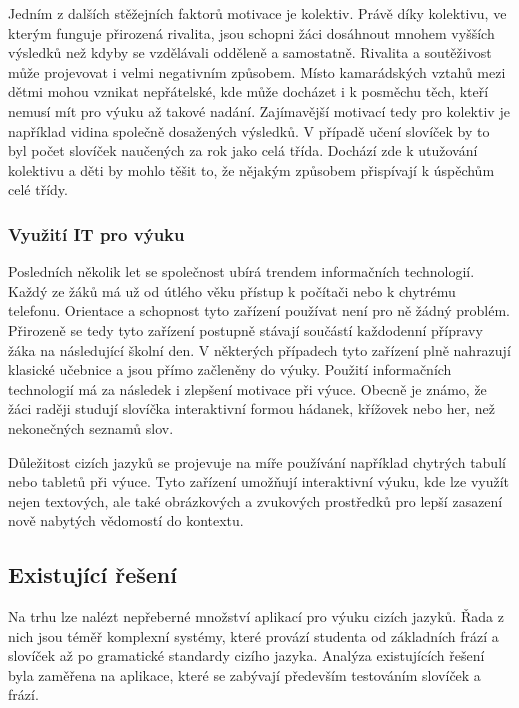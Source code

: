 \documentclass[a4paper,11pt,titlepage,fleqn]{article}
\begin{document}

            Jedním z dalších stěžejních faktorů motivace je kolektiv. Právě díky kolektivu, ve kterým funguje přirozená rivalita, jsou schopni žáci dosáhnout mnohem vyšších výsledků než kdyby se vzdělávali odděleně a samostatně. Rivalita a soutěživost může projevovat i velmi negativním způsobem. Místo kamarádských vztahů mezi dětmi mohou vznikat nepřátelské, kde může docházet i k posměchu těch, kteří nemusí mít pro výuku až takové nadání. Zajímavější motivací tedy pro kolektiv je například vidina společně dosažených výsledků. V případě učení slovíček by to byl počet slovíček naučených za rok jako celá třída. Dochází zde k utužování kolektivu a děti by mohlo těšit to, že nějakým způsobem přispívají k úspěchům celé třídy.

        \subsubsection{Využití IT pro výuku}
            Posledních několik let se společnost ubírá trendem informačních technologií. Každý ze žáků má už od útlého věku přístup k počítači nebo k chytrému telefonu. Orientace a schopnost tyto zařízení používat není pro ně žádný problém. Přirozeně se tedy tyto zařízení postupně stávají součástí každodenní přípravy žáka na následující školní den. V některých případech tyto zařízení plně nahrazují klasické učebnice a jsou přímo začleněny do výuky. Použití informačních technologií má za následek i zlepšení motivace při výuce. Obecně je známo, že žáci raději studují slovíčka interaktivní formou hádanek, křížovek nebo her, než nekonečných seznamů slov.

            Důležitost cizích jazyků se projevuje na míře používání například chytrých tabulí nebo tabletů při výuce. Tyto zařízení umožňují interaktivní výuku, kde lze využít nejen textových, ale také obrázkových a zvukových prostředků pro lepší zasazení nově nabytých vědomostí do kontextu. 


    \subsection{Existující řešení}
        Na trhu lze nalézt nepřeberné množství aplikací pro výuku cizích jazyků. Řada z nich jsou téměř komplexní systémy, které provází studenta od základních frází a slovíček až po gramatické standardy cizího jazyka. Analýza existujících řešení byla zaměřena na aplikace, které se zabývají především testováním slovíček a frází.
\end{document}
